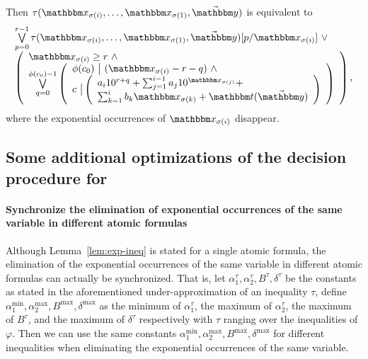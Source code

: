 Then $\tau(\ivarx_{\sigma(i)}, \ldots, \ivarx_{\sigma(1)}, \vec{\ivary})$ is equivalent to 
\[
\begin{array}{l}
\bigvee \limits_{p=0}^{r-1} \tau(\ivarx_{\sigma(i)}, \ldots, \ivarx_{\sigma(1)}, \vec{\ivary})[p/\ivarx_{\sigma(i)}]\ \vee \\
\left(
\begin{array}{l}
\ivarx_{\sigma(i)} \ge r\ \wedge \\
\bigvee \limits_{q = 0}^{\phi(c_0)-1} 
\left(
\begin{array}{l}
\phi(c_0)\ \big |\ (\ivarx_{\sigma(i)} - r - q)\ \wedge \\
c\ \big | 
\left(
\begin{array}{l}
a_i 10^{r+q} + \sum_{j=1}^{i-1} a_j 10^{\ivarx_{\sigma(j)}} + \\
\sum_{k=1}^{i} b_k \ivarx_{\sigma(k)} + \iterm(\vec{\ivary})
\end{array}
\right) 
\end{array}
\right)
\end{array}
\right),
\end{array}
\]
where the exponential occurrences of $\ivarx_{\sigma(i)}$ disappear.


\subsection{Some additional optimizations of the decision procedure for {\paexp}}\label{app-opt}

\paragraph{Synchronize the elimination of exponential occurrences of the same variable in different atomic formulas}

Although Lemma~\ref{lem:exp-ineq} is stated for a single atomic formula, the elimination of the exponential occurrences of the same variable in different atomic formulas can actually be synchronized. That is,  let $\alpha^\tau_{1}, \alpha^\tau_{2}, B^\tau, \delta^\tau$ be the constants as stated in the aforementioned under-approximation of an inequality $\tau$, define $\alpha^{\min}_1, \alpha^{\max}_2, B^{\max}, \delta^{\max}$ as the minimum of $\alpha^\tau_1$, the maximum of $\alpha^\tau_2$, the maximum of $B^\tau$, and the maximum of $\delta^\tau$ respectively with $\tau$ ranging over the inequalities of $\varphi$. Then we can use the same constants $\alpha^{\min}_1, \alpha^{\max}_2, B^{\max}, \delta^{\max}$ for different inequalities when eliminating the exponential occurrences of the same variable. 

